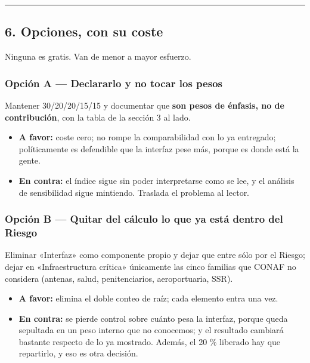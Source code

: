 \documentclass[
  spanish,
  10pt,
]{article}
\providecommand{\tightlist}{%
  \setlength{\itemsep}{0pt}\setlength{\parskip}{0pt}}
\begin{document}
\begin{center}\rule{0.5\linewidth}{0.5pt}\end{center}

\subsection{6. Opciones, con su coste}\label{opciones-con-su-coste}

Ninguna es gratis. Van de menor a mayor esfuerzo.

\subsubsection{Opción A --- Declararlo y no tocar los
pesos}\label{opciuxf3n-a-declararlo-y-no-tocar-los-pesos}

Mantener 30/20/20/15/15 y documentar que \textbf{son pesos de énfasis,
no de contribución}, con la tabla de la sección 3 al lado.

\begin{itemize}
\tightlist
\item
  \textbf{A favor:} coste cero; no rompe la comparabilidad con lo ya
  entregado; políticamente es defendible que la interfaz pese más,
  porque es donde está la gente.
\item
  \textbf{En contra:} el índice sigue sin poder interpretarse como se
  lee, y el análisis de sensibilidad sigue mintiendo. Traslada el
  problema al lector.
\end{itemize}

\subsubsection{Opción B --- Quitar del cálculo lo que ya está dentro del
Riesgo}\label{opciuxf3n-b-quitar-del-cuxe1lculo-lo-que-ya-estuxe1-dentro-del-riesgo}

Eliminar «Interfaz» como componente propio y dejar que entre sólo por el
Riesgo; dejar en «Infraestructura crítica» únicamente las cinco familias
que CONAF no considera (antenas, salud, penitenciarios, aeroportuaria,
SSR).

\begin{itemize}
\tightlist
\item
  \textbf{A favor:} elimina el doble conteo de raíz; cada elemento entra
  una vez.
\item
  \textbf{En contra:} se pierde control sobre cuánto pesa la interfaz,
  porque queda sepultada en un peso interno que no conocemos; y el
  resultado cambiará bastante respecto de lo ya mostrado. Además, el 20
  \% liberado hay que repartirlo, y eso es otra decisión.
\end{itemize}
\end{document}
